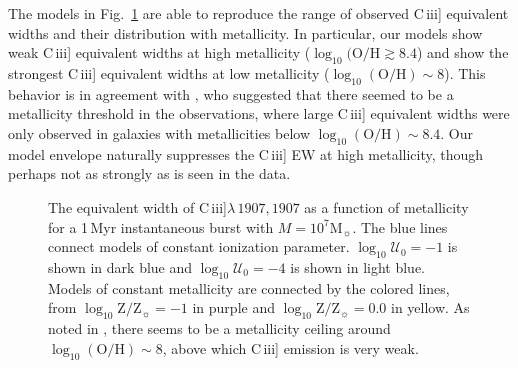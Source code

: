 \documentclass[preprint2]{aastex61}
\newcommand{\ciii}{C\,{\sc iii}]\xspace}
\newcommand\Msun{\ensuremath{\mathrm{M_{\sun}}}\xspace}
\newcommand{\Myr}{$\,$Myr\xspace}
\newcommand{\logten}{\ensuremath{\log_{10}}}
\newcommand{\logZeq}[1]{\ensuremath{\logten \mathrm{Z}/\mathrm{Z}_{\sun} = #1}}
\newcommand{\ang}{\ensuremath{\mbox{\AA}}\xspace}
\newcommand{\logUeq}[1]{\ensuremath{\logten \mathcal{U}_0 = #1}}
\begin{document}
The models in Fig.~\ref{fig:CIIIew} are able to reproduce the range of observed \ciii equivalent widths and their distribution with metallicity. In particular, our models show weak \ciii equivalent widths at high metallicity ($\log_{10}(\mathrm{O}/\mathrm{H} \gtrsim 8.4$) and show the strongest \ciii equivalent widths at low metallicity ($\log_{10}(\mathrm{O}/\mathrm{H}){\sim} 8$). This behavior is in agreement with \citet{Senchyna+2017}, who suggested that there seemed to be a metallicity threshold in the observations, where large \ciii equivalent widths were only observed in galaxies with metallicities below $\log_{10}(\mathrm{O}/\mathrm{H})\sim 8.4$. Our model envelope naturally suppresses the \ciii EW at high metallicity, though perhaps not as strongly as is seen in the data.


\begin{figure}
  \begin{center}
    \caption{The equivalent width of \ciii$\lambda\,1907,1907$ as a function of metallicity for a 1\Myr instantaneous burst with $M=10^7$\Msun. The blue lines connect models of constant ionization parameter. \logUeq{-1} is shown in dark blue and \logUeq{-4} is shown in light blue. Models of constant metallicity are connected by the colored lines, from \logZeq{-1} in purple and \logZeq{0.0} in yellow. As noted in \citet{Senchyna+2017}, there seems to be a metallicity ceiling around $\log_{10}(\mathrm{O}/\mathrm{H})\sim 8$, above which \ciii emission is very weak. }
    \label{fig:CIIIew}
  \end{center}
\end{figure}
\end{document}
